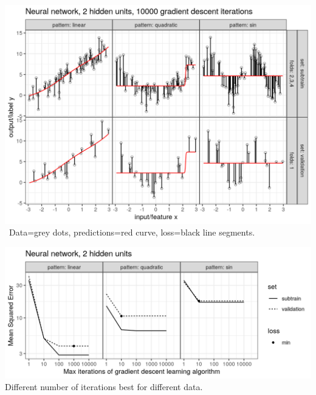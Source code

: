 \begin{frame}
  \includegraphics[width=\textwidth]{figure-overfitting-pred-units=2-maxit=10000.png}
\ Data=grey dots, predictions=red curve, loss=black line segments.

\end{frame}


\begin{frame}
  \includegraphics[width=\textwidth]{figure-overfitting-data-loss-2.png}
Different number of iterations best for different data.
\end{frame}

